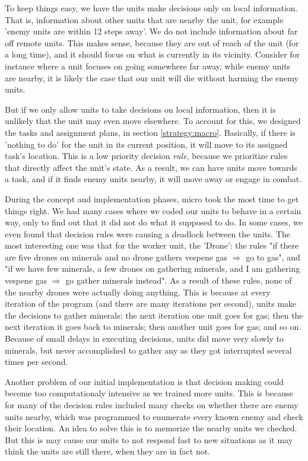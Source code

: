To keep things easy, we have the units make decisions only on local information. That is, information about other units that are nearby the unit, for example 'enemy units are within 12 steps away'. We do not include information about far off remote units. This makes sense, because they are out of reach of the unit (for a long time), and it should focus on what is currently in its vicinity. Consider for instance where a unit focuses on going somewhere far away, while enemy units are nearby, it is likely the case that our unit will die without harming the enemy units.

But if we only allow units to take decisions on local information, then it is unlikely that the unit may even move elsewhere. To account for this, we designed the tasks and assignment plans, in section \ref{strategy:macro}. Basically, if there is 'nothing to do' for the unit in its current position, it will move to its assigned task's location. This is a low priority decision \emph{rule}, because we prioritize rules that directly affect the unit's state. As a result, we can have units move towards a task, and if it finds enemy units nearby, it will move away or engage in combat.

During the concept and implementation phases, micro took the most time to get things right. We had many cases where we coded our units to behave in a certain way, only to find out that it did not do what it supposed to do. In some cases, we even found that decision rules were causing a deadlock between the units. The most interesting one was that for the worker unit, the 'Drone': the rules "if there are five drones on minerals and no drone gathers vespene gas $\Rightarrow$ go to gas", and "if we have few minerals, a few drones on gathering minerals, and I am gathering vespene gas $\Rightarrow$ go gather minerals instead". As a result of these rules, none of the nearby drones were actually doing anything. This is because at every iteration of the program (and there are many iterations per second), units make the decisions to gather minerals; the next iteration one unit goes for gas; then the next iteration it goes back to minerals; then another unit goes for gas; and so on. Because of small delays in executing decisions, units did move very slowly to minerals, but never accomplished to gather any as they got interrupted several times per second.

Another problem of our initial implementation is that decision making could become too computationaly intensive as we trained more units. This is because for many of the decision rules included many checks on whether there are enemy units nearby, which was programmed to enumerate every known enemy and check their location. An idea to solve this is to memorize the nearby units we checked. But this is may cause our units to not respond fast to new situations as it may think the units are still there, when they are in fact not.

